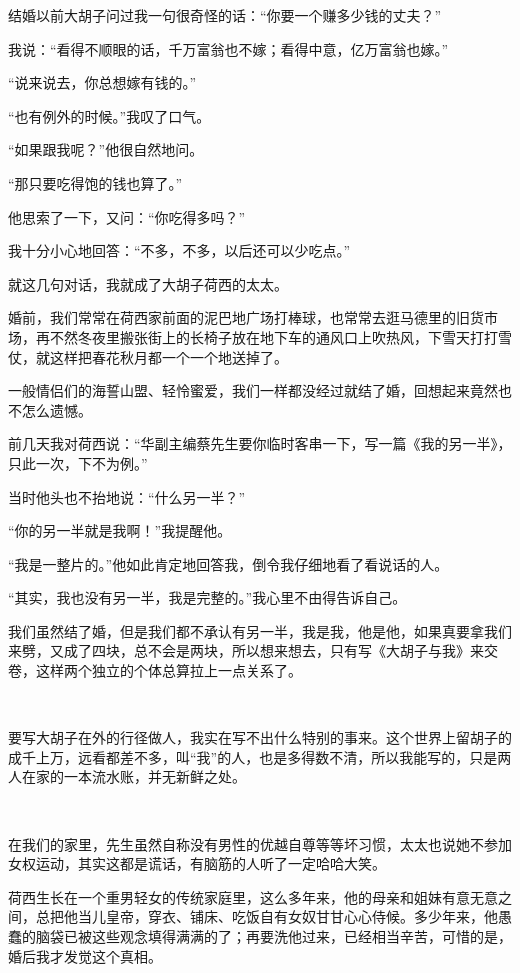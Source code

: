 \par 结婚以前大胡子问过我一句很奇怪的话：“你要一个赚多少钱的丈夫？”
\par 我说：“看得不顺眼的话，千万富翁也不嫁；看得中意，亿万富翁也嫁。”
\par “说来说去，你总想嫁有钱的。”
\par “也有例外的时候。”我叹了口气。
\par “如果跟我呢？”他很自然地问。
\par “那只要吃得饱的钱也算了。”
\par 他思索了一下，又问：“你吃得多吗？”
\par 我十分小心地回答：“不多，不多，以后还可以少吃点。”
\par 就这几句对话，我就成了大胡子荷西的太太。
\par 婚前，我们常常在荷西家前面的泥巴地广场打棒球，也常常去逛马德里的旧货市场，再不然冬夜里搬张街上的长椅子放在地下车的通风口上吹热风，下雪天打打雪仗，就这样把春花秋月都一个一个地送掉了。
\par 一般情侣们的海誓山盟、轻怜蜜爱，我们一样都没经过就结了婚，回想起来竟然也不怎么遗憾。
\par 前几天我对荷西说：“华副主编蔡先生要你临时客串一下，写一篇《我的另一半》，只此一次，下不为例。”
\par 当时他头也不抬地说：“什么另一半？”
\par “你的另一半就是我啊！”我提醒他。
\par “我是一整片的。”他如此肯定地回答我，倒令我仔细地看了看说话的人。
\par “其实，我也没有另一半，我是完整的。”我心里不由得告诉自己。
\par 我们虽然结了婚，但是我们都不承认有另一半，我是我，他是他，如果真要拿我们来劈，又成了四块，总不会是两块，所以想来想去，只有写《大胡子与我》来交卷，这样两个独立的个体总算拉上一点关系了。
\par  
\par 要写大胡子在外的行径做人，我实在写不出什么特别的事来。这个世界上留胡子的成千上万，远看都差不多，叫“我”的人，也是多得数不清，所以我能写的，只是两人在家的一本流水账，并无新鲜之处。
\par  
\par 在我们的家里，先生虽然自称没有男性的优越自尊等等坏习惯，太太也说她不参加女权运动，其实这都是谎话，有脑筋的人听了一定哈哈大笑。
\par 荷西生长在一个重男轻女的传统家庭里，这么多年来，他的母亲和姐妹有意无意之间，总把他当儿皇帝，穿衣、铺床、吃饭自有女奴甘甘心心侍候。多少年来，他愚蠢的脑袋已被这些观念填得满满的了；再要洗他过来，已经相当辛苦，可惜的是，婚后我才发觉这个真相。
